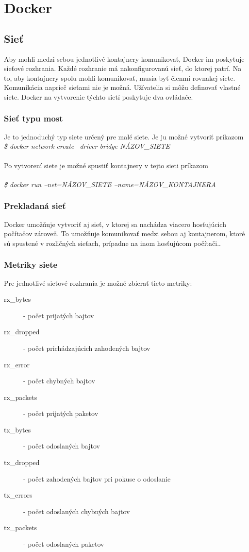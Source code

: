 \documentclass[11pt,final,oneside]{fithesis}
\begin{document}
\section{Docker}
\subsection{Sieť}
Aby mohli medzi sebou jednotlivé kontajnery komunikovať, Docker im poskytuje sieťové rozhrania. Každé rozhranie má nakonfigurovanú sieť,
do ktorej patrí. Na to, aby kontajnery spolu mohli komunikovať, musia byť členmi rovnakej siete. Komunikácia naprieč sieťami nie je možná.
Užívatelia si môžu definovať vlastné siete. Docker na vytvorenie týchto sietí poskytuje dva ovládače.

\subsubsection{Sieť typu most}
Je to jednoduchý typ siete určený pre malé siete. Je ju možné vytvoriť príkazom 
\\
{\em \$ docker network create --driver bridge NÁZOV\_SIETE}
\\ \\
Po vytvorení siete je možné spustiť kontajnery v tejto sieti príkazom
\\ \\
{\em \$ docker run --net=NÁZOV\_SIETE --name=NÁZOV\_KONTAJNERA}

\subsubsection{Prekladaná sieť}
Docker umožňuje vytvoriť aj sieť, v ktorej sa nachádza viacero hosťujúcich počítačov zároveň. To umožňuje komunikovať medzi sebou aj kontajnerom,
ktoré sú spustené v rozličných sieťach, prípadne na inom hosťujúcom počítači..


\subsubsection{Metriky siete}
Pre jednotlivé sieťové rozhrania je možné zbierať tieto metriky:
\begin{description}
\item[rx\_bytes] - počet prijatých bajtov
\item[rx\_dropped] - počet prichádzajúcich zahodených bajtov
\item[rx\_error] - počet chybných bajtov
\item[rx\_packets] - počet prijatých paketov
\item[tx\_bytes] - počet odoslaných bajtov
\item[tx\_dropped] - počet zahodených bajtov pri pokuse o odoslanie
\item[tx\_errors] - počet odoslaných chybných bajtov
\item[tx\_packets] - počet odoslaných paketov
\end{description}
\end{document}
